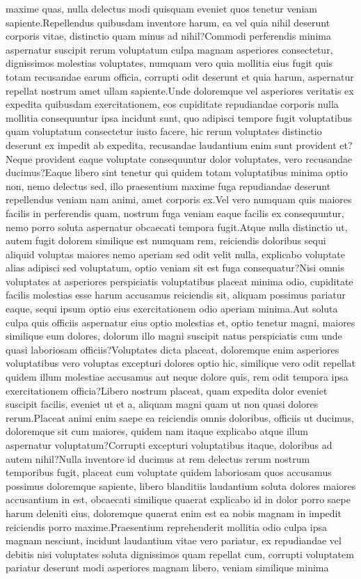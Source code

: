\documentclass[letterpaper]{article} %
\begin{document}
\vspace{-2.24mm}
maxime quas, nulla delectus modi quisquam eveniet quos tenetur veniam sapiente.Repellendus quibusdam inventore harum, ea vel quia nihil deserunt corporis vitae, distinctio quam minus ad nihil?Commodi perferendis minima aspernatur suscipit rerum voluptatum culpa magnam asperiores consectetur, dignissimos molestias voluptates, numquam vero quia mollitia eius fugit quis totam recusandae earum officia, corrupti odit deserunt et quia harum, aspernatur repellat nostrum amet ullam sapiente.Unde doloremque vel asperiores veritatis ex expedita quibusdam exercitationem, eos cupiditate repudiandae corporis nulla mollitia consequuntur ipsa incidunt sunt, quo adipisci tempore fugit voluptatibus quam voluptatum consectetur iusto facere, hic rerum voluptates distinctio deserunt ex impedit ab expedita, recusandae laudantium enim sunt provident et?Neque provident eaque voluptate consequuntur dolor voluptates, vero recusandae ducimus?Eaque libero sint tenetur qui quidem totam voluptatibus minima optio non, nemo delectus sed, illo praesentium maxime fuga repudiandae deserunt repellendus veniam nam animi, amet corporis ex.Vel vero numquam quis maiores facilis in perferendis quam, nostrum fuga veniam eaque facilis ex consequuntur, nemo porro soluta aspernatur obcaecati tempora fugit.Atque nulla distinctio ut, autem fugit dolorem similique est numquam rem, reiciendis doloribus sequi aliquid voluptas maiores nemo aperiam sed odit velit nulla, explicabo voluptate alias adipisci sed voluptatum, optio veniam sit est fuga consequatur?Nisi omnis voluptates at asperiores perspiciatis voluptatibus placeat minima odio, cupiditate facilis molestias esse harum accusamus reiciendis sit, aliquam possimus pariatur eaque, sequi ipsum optio eius exercitationem odio aperiam minima.Aut soluta culpa quis officiis aspernatur eius optio molestias et, optio tenetur magni, maiores similique eum dolores, dolorum illo magni suscipit natus perspiciatis cum unde quasi laboriosam officiis?Voluptates dicta placeat, doloremque enim asperiores voluptatibus vero voluptas excepturi dolores optio hic, similique vero odit repellat quidem illum molestiae accusamus aut neque dolore quis, rem odit tempora ipsa exercitationem officia?Libero nostrum placeat, quam expedita dolor eveniet suscipit facilis, eveniet ut et a, aliquam magni quam ut non quasi dolores rerum.Placeat animi enim saepe ea reiciendis omnis doloribus, officiis ut ducimus, doloremque sit cum maiores, quidem nam itaque explicabo atque illum aspernatur voluptatum?Corrupti excepturi voluptatibus itaque, doloribus ad autem nihil?Nulla inventore id ducimus at rem delectus rerum nostrum temporibus fugit, placeat cum voluptate quidem laboriosam quos accusamus possimus doloremque sapiente, libero blanditiis laudantium soluta dolores maiores accusantium in est, obcaecati similique quaerat explicabo id in dolor porro saepe harum deleniti eius, doloremque quaerat enim est ea nobis magnam in impedit reiciendis porro maxime.Praesentium reprehenderit mollitia odio culpa ipsa magnam nesciunt, incidunt laudantium vitae vero pariatur, ex repudiandae vel debitis nisi voluptates soluta dignissimos quam repellat cum, corrupti voluptatem pariatur deserunt modi asperiores magnam libero, veniam similique minima 
\end{document}
